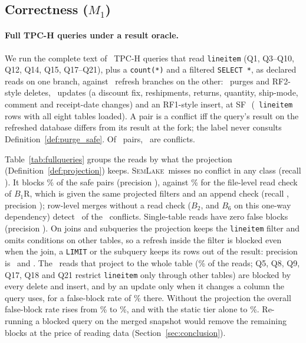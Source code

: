 \documentclass[sigconf, nonacm]{acmart}
\newcommand{\systemname}{\textsc{SemLake}}
\begin{document}
\subsection{Correctness ($M_1$)}
\label{sec:eval_correctness}



\paragraph{Full TPC-H queries under a result oracle.} We run the complete text of \FullTpchQueries\ TPC-H queries that read \texttt{lineitem} (Q1, Q3--Q10, Q12, Q14, Q15, Q17--Q21), plus a \texttt{count(*)} and a filtered \texttt{SELECT *}, as declared reads on one branch, against \FullRefreshes\ refresh branches on the other: \FullDeletes\ purges and RF2-style deletes, \FullUpdates\ updates (a discount fix, reshipments, returns, quantity, ship-mode, comment and receipt-date changes) and an RF1-style insert, at SF\,\FullSF\ (\FullRows\ \texttt{lineitem} rows with all eight tables loaded). A pair is a conflict iff the query's result on the refreshed database differs from its result at the fork; the label never consults Definition~\ref{def:purge_safe}. Of \FullPairs\ pairs, \FullPos\ are conflicts.

Table~\ref{tab:fullqueries} groups the reads by what the projection (Definition~\ref{def:projection}) keeps. \systemname\ misses no conflict in any class (recall \FullSemRec). It blocks \FullSemFBPct\% of the safe pairs (precision \FullSemPrec), against \FullBoneRFBPct\% for the file-level read check of $B_1\text{R}$, which is given the same projected filters and an append check (recall \FullBoneRRec, precision \FullBoneRPrec); row-level merges without a read check ($B_2$, and $B_6$ on this one-way dependency) detect \FullOthersTP\ of the \FullPos\ conflicts. Single-table reads have zero false blocks (precision \FullSemPrecSingle). On joins and subqueries the projection keeps the \texttt{lineitem} filter and omits conditions on other tables, so a refresh inside the filter is blocked even when the join, a \texttt{LIMIT} or the subquery keeps its rows out of the result: precision is \FullSemPrecJoin\ and \FullSemPrecSub. The \FullWideReads\ reads that project to the whole table (\FullWidePct\% of the reads; Q5, Q8, Q9, Q17, Q18 and Q21 restrict \texttt{lineitem} only through other tables) are blocked by every delete and insert, and by an update only when it changes a column the query uses, for a false-block rate of \FullSemFBWidePct\% there. Without the projection the overall false-block rate rises from \FullSemFBPct\% to \FullNoProjFBPct\%, and with the static tier alone to \FullStaticFBPct\%. Re-running a blocked query on the merged snapshot would remove the remaining blocks at the price of reading data (Section~\ref{sec:conclusion}).
\end{document}
